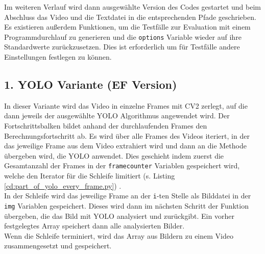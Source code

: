 {	\ifimportant
	
	\fi	Im weiteren Verlauf wird dann ausgewählte Version des Codes gestartet und beim Abschluss das Video und die Textdatei in die entsprechenden Pfade geschrieben.
	Es existieren außerdem Funktionen, um die Testfälle zur Evaluation mit einem Programmdurchlauf zu generieren und die \lstinline|options| Variable wieder auf ihre Standardwerte zurückzusetzen. Dies ist erforderlich um für Testfälle andere Einstellungen festlegen zu können.
}



\subsection{1. YOLO Variante (EF Version)} {
	\label{py:YOLO_every_frame}
	In dieser Variante wird das Video in einzelne Frames mit CV2 zerlegt, auf die dann jeweils der ausgewählte YOLO Algorithmus angewendet wird. Der Fortschrittsbalken bildet anhand der durchlaufenden Frames den Berechnungsfortschritt ab. 
	Es wird über alle Frames des Videos iteriert, in der das jeweilige Frame aus dem Video extrahiert wird und dann an die Methode übergeben wird, die YOLO anwendet. 
	\ifimportant
	\fi	Dies geschieht indem zuerst die Gesamtanzahl der Frames in der \lstinline|framecounter| Variablen gespeichert wird, welche den Iterator für die Schleife limitiert \ifimportant (s. Listing \ref{cd:part_of_yolo_every_frame.py}) \fi . \\ 
	In der Schleife wird das jeweilige Frame an der \lstinline|i|-ten Stelle als Bilddatei in der \lstinline|img| Variablen gespeichert. Dieses wird dann im nächsten Schritt der Funktion übergeben, die das Bild mit YOLO analysiert und zurückgibt. Ein vorher festgelegtes Array speichert dann alle analysierten Bilder. \\ 
	Wenn die Schleife terminiert, wird das Array aus Bildern zu einem Video zusammengesetzt und gespeichert. \\
	\ifimportant
	
}
